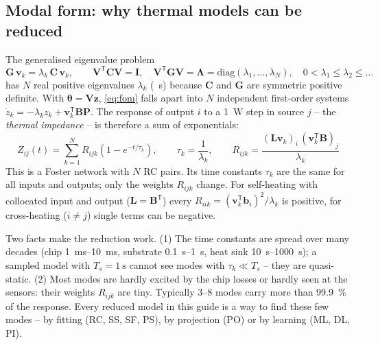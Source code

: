 \documentclass[11pt,a4paper]{article}
\newcommand{\T}{^{\mathsf T}}
\newcommand{\mat}[1]{\bm{#1}}
\begin{document}
\subsection{Modal form: why thermal models can be reduced}\label{sec:modal}
The generalised eigenvalue problem
\begin{equation}
  \mat G\,\bm v_k = \lambda_k\,\mat C\,\bm v_k,\qquad \mat V\T\mat C\mat V = \mat I,\quad \mat V\T\mat G\mat V =
  \bm\Lambda = \mathrm{diag}(\lambda_1,\dots,\lambda_N),\quad 0<\lambda_1\le\lambda_2\le\dots
  \label{eq:gevp}
\end{equation}
has $N$ real positive eigenvalues $\lambda_k$ (\si{\per\second}) because $\mat C$ and $\mat G$ are symmetric
positive definite. With $\bm\theta = \mat V\bm z$, \eqref{eq:fom} falls apart into $N$ independent first-order
systems $\dot z_k = -\lambda_k z_k + \bm v_k\T\mat B\bm P$. The response of output $i$ to a \SI{1}{\watt} step in
source $j$ -- the \emph{thermal impedance} -- is therefore a sum of exponentials:
\begin{equation}
  \boxed{\;Z_{ij}(t) = \sum_{k=1}^{N} R_{ijk}\left(1-e^{-t/\tau_k}\right),\qquad
  \tau_k = \frac{1}{\lambda_k},\qquad R_{ijk} = \frac{(\mat L\bm v_k)_i\,(\bm v_k\T\mat B)_j}{\lambda_k}\;}
  \label{eq:modalZ}
\end{equation}
This is a Foster network with $N$ RC pairs. Its time constants $\tau_k$ are the same for all inputs and outputs; only
the weights $R_{ijk}$ change. For self-heating with collocated input and output ($\mat L = \mat B\T$) every
$R_{iik} = (\bm v_k\T\bm b_i)^2/\lambda_k$ is positive, for cross-heating ($i\ne j$) single terms can be negative.

\begin{keybox}
Two facts make the reduction work. (1) The time constants are spread over many decades (chip
\SIrange{1}{10}{\milli\second}, substrate \SIrange{0.1}{1}{\second}, heat sink \SIrange{10}{1000}{\second}); a
sampled model with $T_s=\SI{1}{\second}$ cannot see modes with $\tau_k\ll T_s$ -- they are quasi-static. (2) Most
modes are hardly excited by the chip losses or hardly seen at the sensors: their weights $R_{ijk}$ are tiny. Typically
3--8 modes carry more than \SI{99.9}{\percent} of the response. Every reduced model in this guide is a way to find
these few modes -- by fitting (RC, SS, SF, PS), by projection (PO) or by learning (ML, DL, PI).
\end{keybox}
\end{document}
